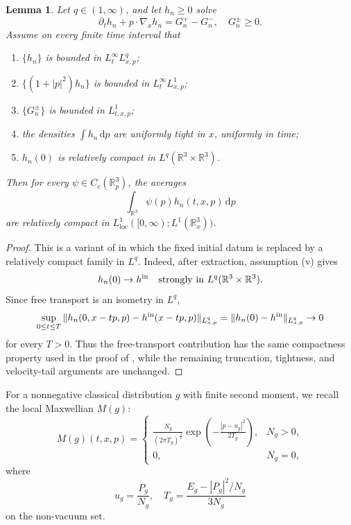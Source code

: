 \documentclass[10pt,reqno]{amsart}
\numberwithin{equation}{section}
\newtheorem{lemma}{Lemma}[section]
\theoremstyle{definition}
\newcommand{\R}{\mathbb R}
\newcommand{\dpp}{\mathrm{d}p}
\newcommand{\lt}{\left}
\newcommand{\rt}{\right}
\newcommand{\pa}{\partial}
\begin{document}
\begin{lemma}\label{lem:L1-aver}
Let $q\in(1,\infty)$, and let $h_n\geq0$ solve
\[
\pa_t h_n+p\cdot\nabla_x h_n=G_n^+-G_n^-,  \quad G_n^\pm\geq0.
\]
Assume on every finite time interval that
\begin{enumerate}[label=(\roman*)]
 \item $\{h_n\}$ is bounded in $L^\infty_tL^q_{x,p}$;
 \item $\{(1+|p|^2)h_n\}$ is bounded in $L^\infty_tL^1_{x,p}$;
 \item $\{G_n^\pm\}$ is bounded in $L^1_{t,x,p}$;
 \item the densities $\int h_n\,\dpp$ are uniformly tight in $x$, uniformly in time;
 \item $h_n(0)$ is relatively compact in $L^q(\R^3\times\R^3)$.
\end{enumerate}
Then for every $\psi\in C_c(\R^3_p)$, the averages
\[
 \int_{\R^3}\psi(p)h_n(t,x,p)\,\dpp
\]
are relatively compact in $L^1_{\mathrm{loc}}([0,\infty);L^1(\R^3_x))$.
\end{lemma}

\begin{proof}
This is a variant of \cite[Proposition 4.1]{KS25} in which the fixed initial datum is replaced by a relatively compact family in $L^q$. Indeed, after extraction, assumption (v) gives
\[
 h_n(0) \to h^{\rm in}  \quad\text{strongly in }L^q(\R^3 \times \R^3).
\]
Since free transport is an isometry in $L^q$,
\[
 \sup_{0\le t\le T}  \|  h_n(0,x-tp,p)-h^{\rm in}(x-tp,p)\|_{L^q_{x,p}}  =  \|h_n(0)-h^{\rm in}\|_{L^q_{x,p}} \to 0
\]
for every $T>0$.  Thus the free-transport contribution has the same compactness property used in the proof of \cite[Proposition 4.1]{KS25}, while the remaining truncation, tightness, and velocity-tail arguments are unchanged.
\end{proof}

For a nonnegative classical distribution $g$ with finite second moment, we recall the local Maxwellian $M(g)$:
\[
 M(g)(t,x,p)=
 \begin{cases}
 \displaystyle  \frac{N_g}{(2\pi T_g)^{\frac32}} \exp \lt(-\frac{|p-u_g|^2}{2T_g}\rt),&N_g>0,\\[8pt]
 0,&N_g=0,
 \end{cases}
\]
where
\[
 u_g=\frac{P_g}{N_g},  \quad  T_g=\frac{E_g-|P_g|^2/N_g}{3N_g}
\]
on the non-vacuum set.
\end{document}
